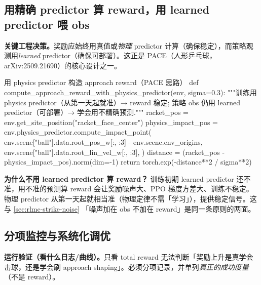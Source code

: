 
\subsection{用精确 predictor 算 reward，用 learned predictor 喂 obs}

\textbf{关键工程决策。}奖励应始终用真值或\emph{物理} predictor 计算（确保稳定），而策略观测用\emph{learned} predictor（确保可部署）。这正是 PACE（人形乒乓球，arXiv:2509.21690）的核心设计之一。

\begin{codebox}[Python]{用 physics predictor 构造 approach reward（PACE 思路）}
def compute_approach_reward_with_physics_predictor(env, sigma=0.3):
    """训练用 physics predictor（从第一天起就准）→ reward 稳定;
       策略 obs 仍用 learned predictor（可部署）→ 学会用不精确预测."""
    racket_pos = env.get_site_position("racket_face_center")
    physics_impact_pos = env.physics_predictor.compute_impact_point(
        env.scene["ball"].data.root_pos_w[:, :3] - env.scene.env_origins,
        env.scene["ball"].data.root_lin_vel_w[:, :3],
    )
    distance = (racket_pos - physics_impact_pos).norm(dim=-1)
    return torch.exp(-distance**2 / sigma**2)
\end{codebox}

\textbf{为什么不用 learned predictor 算 reward？} 训练初期 learned predictor 还不准，用不准的预测算 reward 会让奖励噪声大、PPO 梯度方差大、训练不稳定。物理 predictor 从第一天起就相当准（物理定律不需「学习」），提供稳定信号。这与 \cref{sec:rlmc-strike-noise} 「噪声加在 obs 不加在 reward」是同一条原则的两面。

\subsection{分项监控与系统化调优}

\textbf{运行验证（看什么日志/曲线）。}只看 total reward 无法判断「奖励上升是真学会击球，还是学会刷 approach shaping」。必须分项记录，并单列\emph{真正的成功度量}（不是 reward）。

